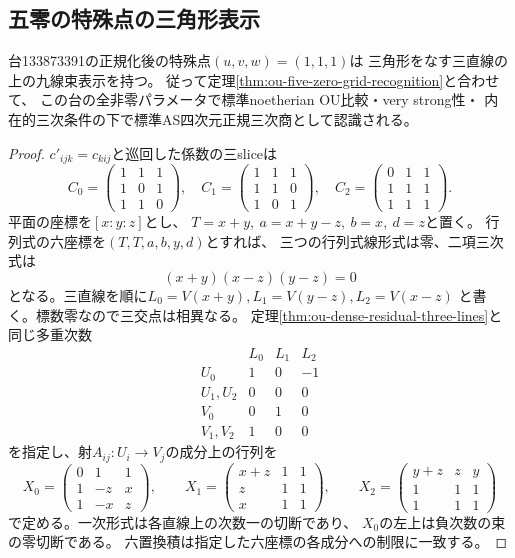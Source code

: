 \subsection{五零の特殊点の三角形表示}
\label{subsec:ou-five-zero-triangle}

\begin{theorem}[133873391の特殊点の九線束表示]
\label{thm:ou-five-zero-triangle}
台133873391の正規化後の特殊点$(u,v,w)=(1,1,1)$は
三角形をなす三直線の上の九線束表示を持つ。
従って定理\ref{thm:ou-five-zero-grid-recognition}と合わせて、
この台の全非零パラメータで標準noetherian OU比較・very strong性・
内在的三次条件の下で標準AS四次元正規三次商として認識される。
\end{theorem}
\begin{proof}
$c'_{ijk}=c_{kij}$と巡回した係数の三sliceは
\[
 C_0=\begin{pmatrix}1&1&1\\1&0&1\\1&1&0\end{pmatrix},\quad
 C_1=\begin{pmatrix}1&1&1\\1&1&0\\1&0&1\end{pmatrix},\quad
 C_2=\begin{pmatrix}0&1&1\\1&1&1\\1&1&1\end{pmatrix}.
\]
平面の座標を$[x:y:z]$とし、
$T=x+y,\ a=x+y-z,\ b=x,\ d=z$と置く。
行列式の六座標を$(T,T,a,b,y,d)$とすれば、
三つの行列式線形式は零、二項三次式は
\[
 (x+y)(x-z)(y-z)=0
\]
となる。三直線を順に$L_0=V(x+y),L_1=V(y-z),L_2=V(x-z)$
と書く。標数零なので三交点は相異なる。
定理\ref{thm:ou-dense-residual-three-lines}と同じ多重次数
\[
\begin{array}{c|rrr}
 &L_0&L_1&L_2\\ \hline
 U_0&1&0&-1\\
 U_1,U_2&0&0&0\\
 V_0&0&1&0\\
 V_1,V_2&1&0&0
\end{array}
\]
を指定し、射$A_{ij}:U_i\to V_j$の成分上の行列を
\[
 X_0=\begin{pmatrix}0&1&1\\1&-z&x\\1&-x&z\end{pmatrix},\qquad
 X_1=\begin{pmatrix}x+z&1&1\\z&1&1\\x&1&1\end{pmatrix},\qquad
 X_2=\begin{pmatrix}y+z&z&y\\1&1&1\\1&1&1\end{pmatrix}
\]
で定める。一次形式は各直線上の次数一の切断であり、
$X_0$の左上は負次数の束の零切断である。
六置換積は指定した六座標の各成分への制限に一致する。


\end{proof}
